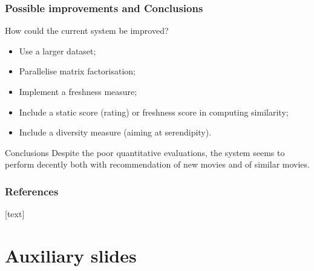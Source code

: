 \documentclass[xcolor = {table}]{beamer}
\begin{document}
  \begin{frame}
    \frametitle{Possible improvements and Conclusions}

    How could the current system be improved?

    \vspace{0.5em}

    \begin{itemize}
      \setlength\itemsep{0.5em}
      \item Use a larger dataset;
      \item Parallelise matrix factorisation;
      \item Implement a freshness measure;
      \item Include a static score (rating) or freshness score in computing similarity;
      \item Include a diversity measure (aiming at serendipity).
    \end{itemize}

    \vspace{2em}

    \begin{block}{Conclusions}
      Despite the poor quantitative evaluations, the system seems to perform decently both with recommendation of new movies and of similar movies.
    \end{block}

  \end{frame}



  \begin{frame}
    \frametitle{References}

    \nocite{*}

    [text]

    
    \footnotesize{
       
    }
  \end{frame}

  

  \appendix
  \backupbegin

  \section{Auxiliary slides}
\end{document}
